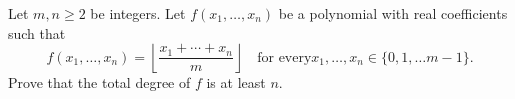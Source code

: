 Let $m, n \ge 2$ be integers. Let $f(x_1, \dots, x_n)$ be a polynomial with real coefficients such that
\[f(x_1, \dots, x_n) = \left \lfloor{\dfrac{x_1 + \cdots + x_n}{m}}\right \rfloor \quad \text{for every} x_1, \dots, x_n \in \{0, 1, \dots m-1\}.\]
Prove that the total degree of $f$ is at least $n$.
